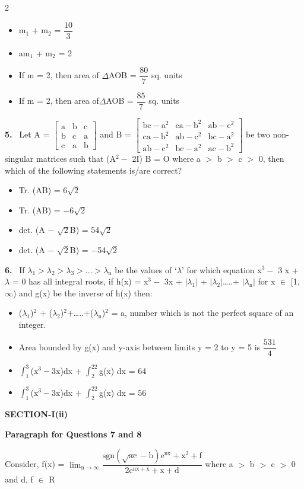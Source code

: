 \documentclass[10pt]{extarticle}
\newcommand{\sect}[1]{\par\smallskip\noindent\textbf{#1}\par}
\newcommand{\qn}[1]{\par\smallskip\noindent\textbf{#1.}~}
\newcommand{\paraq}[2]{\par\smallskip\noindent\textbf{Paragraph for Questions #1 and #2}\par}
\newenvironment{qoptions}{\begin{itemize}[leftmargin=1.8em,itemsep=1pt,topsep=2pt,label={}]}{\end{itemize}}
\newcommand{\opt}[2]{\item[(#1)] #2}
\begin{document}
\begin{multicols}{2}
\begin{qoptions}
\opt{A}{m$_1$ + m$_2$ = $\dfrac{10}3$}
\opt{B}{am$_1$ + m$_2$ = 2}
\opt{C}{If m = 2, then area of $\Delta$AOB = $\dfrac{80}7$ sq. units}
\opt{D}{If m = 2, then area of$\Delta$AOB = $\dfrac{85}7$ sq. units}
\end{qoptions}
\qn{5} Let A = $\begin{bmatrix}\mathrm a&\mathrm b&\mathrm c\\\mathrm b&\mathrm c&\mathrm a\\\mathrm c&\mathrm a&\mathrm b\end{bmatrix}$ and B = $\begin{bmatrix}\mathrm{bc}-\mathrm a^2&\mathrm{ca}-\mathrm b^2&\mathrm{ab}-\mathrm c^2\\\mathrm{ca}-\mathrm b^2&\mathrm{ab}-\mathrm c^2&\mathrm{bc}-\mathrm a^2\\\mathrm{ab}-\mathrm c^2&\mathrm{bc}-\mathrm a^2&\mathrm{ac}-\mathrm b^2\end{bmatrix}$ be two non-singular matrices such that (A$^2-$ 2I) B = O where a $>$ b $>$ c $>$ 0, then which of the following statements is/are correct?\par
[\textbf{Note:} I is an identify matrix of order 3 and Tr. (P) and det. (P) denote trace and value of the determinant of square matrix P respectively.]
\begin{qoptions}
\opt{A}{Tr. (AB) = 6$\sqrt2$}
\opt{B}{Tr. (AB) = $-$6$\sqrt2$}
\opt{C}{det. (A $-$ $\sqrt2$B) = 54$\sqrt2$}
\opt{D}{det. (A $-$ $\sqrt2$B) = $-$54$\sqrt2$}
\end{qoptions}
\qn{6} If $\lambda_1>\lambda_2>\lambda_3>\ldots>\lambda_\mathrm n$ be the values of `$\lambda$' for which equation x$^3-$ 3 x + $\lambda$ = 0 has all integral roots, if h(x) = x$^3-$ 3x + $|\lambda_1|$ + $|\lambda_2|$\ldots..+ $|\lambda_\mathrm n|$ for x $\in$ [1, $\infty$) and g(x) be the inverse of h(x) then:
\begin{qoptions}
\opt{A}{($\lambda_1$)$^2$ + ($\lambda_2$)$^2$+\ldots..+($\lambda_\mathrm n$)$^2$ = a, number which is not the perfect square of an integer.}
\opt{B}{Area bounded by g(x) and y-axis between limits y = 2 to y = 5 is $\dfrac{531}4$}
\opt{C}{$\displaystyle\int_1^3$(x$^3-$3x)dx + $\displaystyle\int_2^{22}$g(x) dx = 64}
\opt{D}{$\displaystyle\int_1^3$(x$^3-$3x)dx + $\displaystyle\int_2^{22}$g(x) dx = 56}
\end{qoptions}
\sect{SECTION-I(ii)}
\paraq{7}{8}
Consider, f(x) = $\displaystyle\lim_{\mathrm n\to\infty}\dfrac{\mathrm{sgn}(\sqrt{\mathrm{ac}}-\mathrm b)\mathrm e^{\mathrm{nx}}+\mathrm x^2+\mathrm f}{2\mathrm e^{\mathrm{nx}+\mathrm x}+\mathrm x+\mathrm d}$ where a $>$ b $>$ c $>$ 0 and d, f $\in$ R\par

\end{multicols}
\end{document}
